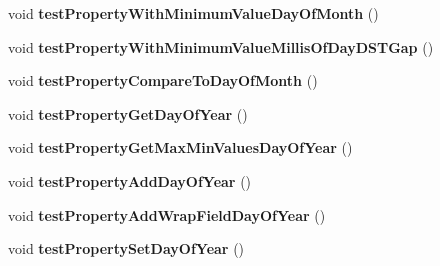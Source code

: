 \begin{DoxyCompactItemize}
\item 
\hypertarget{classorg_1_1joda_1_1time_1_1_test_date_time___properties_a7ff83e76ae0591dc87017acdb2705d90}{void {\bfseries test\-Property\-With\-Minimum\-Value\-Day\-Of\-Month} ()}\label{classorg_1_1joda_1_1time_1_1_test_date_time___properties_a7ff83e76ae0591dc87017acdb2705d90}

\item 
\hypertarget{classorg_1_1joda_1_1time_1_1_test_date_time___properties_a7b113a061317f45175d3d1ef9dbd8a14}{void {\bfseries test\-Property\-With\-Minimum\-Value\-Millis\-Of\-Day\-D\-S\-T\-Gap} ()}\label{classorg_1_1joda_1_1time_1_1_test_date_time___properties_a7b113a061317f45175d3d1ef9dbd8a14}

\item 
\hypertarget{classorg_1_1joda_1_1time_1_1_test_date_time___properties_ac1bdc068ea404501e46954825a66b3c4}{void {\bfseries test\-Property\-Compare\-To\-Day\-Of\-Month} ()}\label{classorg_1_1joda_1_1time_1_1_test_date_time___properties_ac1bdc068ea404501e46954825a66b3c4}

\item 
\hypertarget{classorg_1_1joda_1_1time_1_1_test_date_time___properties_aa1eaa422ca3aa96c7db9848432596c46}{void {\bfseries test\-Property\-Get\-Day\-Of\-Year} ()}\label{classorg_1_1joda_1_1time_1_1_test_date_time___properties_aa1eaa422ca3aa96c7db9848432596c46}

\item 
\hypertarget{classorg_1_1joda_1_1time_1_1_test_date_time___properties_ad7a968ff471588a17969f2d7b8bad347}{void {\bfseries test\-Property\-Get\-Max\-Min\-Values\-Day\-Of\-Year} ()}\label{classorg_1_1joda_1_1time_1_1_test_date_time___properties_ad7a968ff471588a17969f2d7b8bad347}

\item 
\hypertarget{classorg_1_1joda_1_1time_1_1_test_date_time___properties_af78a8d3d6d41fed30d791255f61b0212}{void {\bfseries test\-Property\-Add\-Day\-Of\-Year} ()}\label{classorg_1_1joda_1_1time_1_1_test_date_time___properties_af78a8d3d6d41fed30d791255f61b0212}

\item 
\hypertarget{classorg_1_1joda_1_1time_1_1_test_date_time___properties_ab98b778f56ac48b184dcc7f6b15079f2}{void {\bfseries test\-Property\-Add\-Wrap\-Field\-Day\-Of\-Year} ()}\label{classorg_1_1joda_1_1time_1_1_test_date_time___properties_ab98b778f56ac48b184dcc7f6b15079f2}

\item 
\hypertarget{classorg_1_1joda_1_1time_1_1_test_date_time___properties_a78fb49a87a2d5715ec8ea03f2e13ad9d}{void {\bfseries test\-Property\-Set\-Day\-Of\-Year} ()}\label{classorg_1_1joda_1_1time_1_1_test_date_time___properties_a78fb49a87a2d5715ec8ea03f2e13ad9d}


\end{DoxyCompactItemize}
